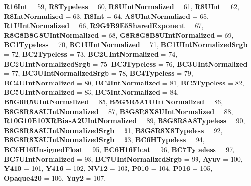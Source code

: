 \begin{DoxyCompactItemize}
{\bfseries R16\+Int} = 59, 
{\bfseries R8\+Typeless} = 60, 
{\bfseries R8\+U\+Int\+Normalized} = 61, 
\newline
{\bfseries R8\+U\+Int} = 62, 
{\bfseries R8\+Int\+Normalized} = 63, 
{\bfseries R8\+Int} = 64, 
{\bfseries A8\+U\+Int\+Normalized} = 65, 
\newline
{\bfseries R1\+U\+Int\+Normalized} = 66, 
{\bfseries R9\+G9\+B9\+E5\+Shared\+Exponent} = 67, 
{\bfseries R8\+G8\+B8\+G8\+U\+Int\+Normalized} = 68, 
{\bfseries G8\+R8\+G8\+B8\+U\+Int\+Normalized} = 69, 
\newline
{\bfseries B\+C1\+Typeless} = 70, 
{\bfseries B\+C1\+U\+Int\+Normalized} = 71, 
{\bfseries B\+C1\+U\+Int\+Normalized\+Srgb} = 72, 
{\bfseries B\+C2\+Typeless} = 73, 
\newline
{\bfseries B\+C2\+U\+Int\+Normalized} = 74, 
{\bfseries B\+C2\+U\+Int\+Normalized\+Srgb} = 75, 
{\bfseries B\+C3\+Typeless} = 76, 
{\bfseries B\+C3\+U\+Int\+Normalized} = 77, 
\newline
{\bfseries B\+C3\+U\+Int\+Normalized\+Srgb} = 78, 
{\bfseries B\+C4\+Typeless} = 79, 
{\bfseries B\+C4\+U\+Int\+Normalized} = 80, 
{\bfseries B\+C4\+Int\+Normalized} = 81, 
\newline
{\bfseries B\+C5\+Typeless} = 82, 
{\bfseries B\+C5\+U\+Int\+Normalized} = 83, 
{\bfseries B\+C5\+Int\+Normalized} = 84, 
{\bfseries B5\+G6\+R5\+U\+Int\+Normalized} = 85, 
\newline
{\bfseries B5\+G5\+R5\+A1\+U\+Int\+Normalized} = 86, 
{\bfseries B8\+G8\+R8\+A8\+U\+Int\+Normalized} = 87, 
{\bfseries B8\+G8\+R8\+X8\+U\+Int\+Normalized} = 88, 
{\bfseries R10\+G10\+B10\+X\+R\+Bias\+A2\+U\+Int\+Normalized} = 89, 
\newline
{\bfseries B8\+G8\+R8\+A8\+Typeless} = 90, 
{\bfseries B8\+G8\+R8\+A8\+U\+Int\+Normalized\+Srgb} = 91, 
{\bfseries B8\+G8\+R8\+X8\+Typeless} = 92, 
{\bfseries B8\+G8\+R8\+X8\+U\+Int\+Normalized\+Srgb} = 93, 
\newline
{\bfseries B\+C6\+H\+Typeless} = 94, 
{\bfseries B\+C6\+H16\+Unsigned\+Float} = 95, 
{\bfseries B\+C6\+H16\+Float} = 96, 
{\bfseries B\+C7\+Typeless} = 97, 
\newline
{\bfseries B\+C7\+U\+Int\+Normalized} = 98, 
{\bfseries B\+C7\+U\+Int\+Normalized\+Srgb} = 99, 
{\bfseries Ayuv} = 100, 
{\bfseries Y410} = 101, 
\newline
{\bfseries Y416} = 102, 
{\bfseries N\+V12} = 103, 
{\bfseries P010} = 104, 
{\bfseries P016} = 105, 
\newline
{\bfseries Opaque420} = 106, 
{\bfseries Yuy2} = 107, 

\end{DoxyCompactItemize}

